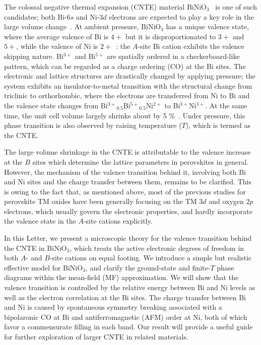 \documentclass[aps,twocolumn,prl,showpacs,preprintnumbers,amsmath,amssymb]{revtex4}
\begin{document}
The colossal negative thermal expansion (CNTE) material BiNiO$_3$~\cite{Ishiwata_1} is one of such candidates; both Bi-$6s$ and Ni-$3d$ electrons are expected to play a key role in the large volume change~\cite{Azuma_nat, Nabetani}. 
At ambient pressure, BiNiO$_3$ has a unique valence state, where the average valence of Bi is $4+$ but it is disproportionated to $3+$ and $5+$, while the valence of Ni is $2+$~\cite{Wadati}: the $A$-site Bi cation exhibits the valence skipping nature. 
Bi${^{3+}}$ and Bi$^{5+}$ are spatially ordered in a checkerboard-like pattern, which can be regarded as a charge ordering (CO) at the Bi sites.
The electronic and lattice structures are drastically changed by applying pressure; the system exhibits an insulator-to-metal transition with the structural change from triclinic to orthorhombic, where the electrons are transferred from Ni to Bi and the valence state changes from Bi${^{3+}}_{0.5}$Bi${^{5+}}_{0.5}$Ni$^{2+}$ to Bi$^{3+}$Ni$^{3+}$. 
At the same time, the unit cell volume largely shrinks about by 5 $\%$~\cite{Azuma_nat, Ishiwata_2, Azuma_jacs}. 
Under pressure, this phase transition is also observed by raising temperature ($T$), which is termed as the CNTE. 

The large volume shrinkage in the CNTE is attributable to the valence increase at the $B$ sites which determine the lattice parameters in perovskites in general. 
However, the mechanism of the valence transition behind it, involving both Bi and Ni sites and the charge transfer between them, remains to be clarified. 
This is owing to the fact that, as mentioned above, most of the previous studies for perovskite TM oxides have been generally focusing on the TM $3d$  and oxygen $2p$ electrons, which usually govern the electronic properties, and hardly incorporate the valence state in the $A$-site cations explicitly. 

In this Letter, we present a microscopic theory for the valence transition behind the CNTE in BiNiO$_3$, which treats the active electronic degrees of freedom in both $A$- and $B$-site cations on equal footing. 
We introduce a simple but realistic effective model for BiNiO$_3$, and clarify the ground-state and finite-$T$ phase diagrams within the mean-field (MF) approximation. 
We will show that the valence transition is controlled by the relative energy between Bi and Ni levels as well as the electron correlation at the Bi sites. 
The charge transfer between Bi and Ni is caused by spontaneous symmetry breaking associated with a bipolaronic CO at Bi and antiferromagnetic (AFM) order at Ni, both of which favor a commensurate filling in each band. 
Our result will provide a useful guide for further exploration of larger CNTE in related materials. 
\end{document}
